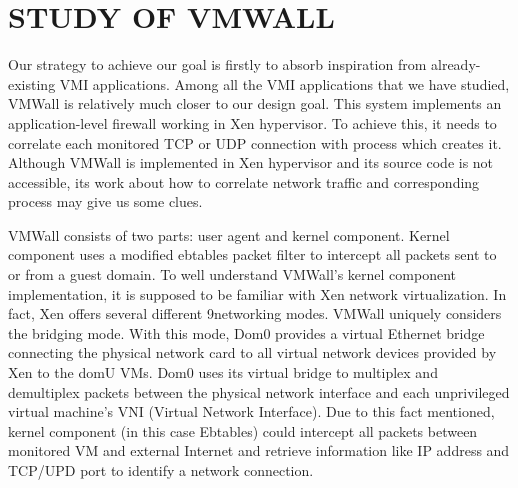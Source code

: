 
\chapter{STUDY OF VMWALL\citep{Reference2}} %

\label{Chapter4} %


Our strategy to achieve our goal is firstly to absorb inspiration from already-existing VMI applications. Among all the
VMI applications that we have studied, VMWall is relatively much closer to our design goal. This system implements
an application-level firewall working in Xen hypervisor. To achieve this, it needs to correlate each monitored TCP or
UDP connection with process which creates it. Although VMWall is implemented in Xen hypervisor and its source code
is not accessible, its work about how to correlate network traffic and corresponding process may give us some clues.

VMWall consists of two parts: user agent and kernel component. Kernel component uses a modified ebtables \cite{Reference21}
packet filter to intercept all packets sent to or from a guest domain. To well understand VMWall’s kernel component
implementation, it is supposed to be familiar with Xen network virtualization. In fact, Xen offers several different
9networking modes. VMWall uniquely considers the bridging mode. With this mode, Dom0 provides a virtual Ethernet
bridge connecting the physical network card to all virtual network devices provided by Xen to the domU VMs. Dom0
uses its virtual bridge to multiplex and demultiplex packets between the physical network interface and each
unprivileged virtual machine’s VNI (Virtual Network Interface). Due to this fact mentioned, kernel component (in this
case Ebtables) could intercept all packets between monitored VM and external Internet and retrieve information like IP
address and TCP/UPD port to identify a network connection.

